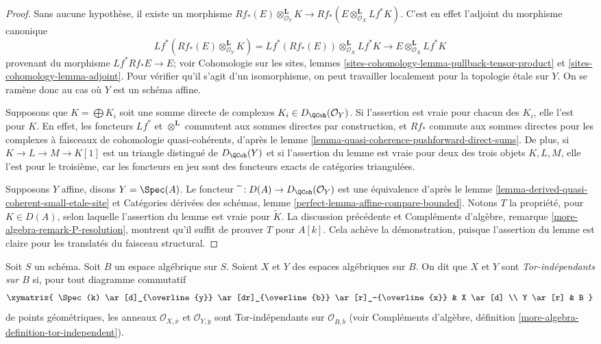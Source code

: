 \begin{proof}
Sans aucune hypoth\`ese, il existe un morphisme
$Rf_*(E)\otimes_{\mathcal{O}_Y}^\mathbf{L}K\to
Rf_*(E\otimes_{\mathcal{O}_X}^\mathbf{L}Lf^*K)$. C'est en effet l'adjoint du
morphisme canonique
$$
Lf^*(Rf_*(E) \otimes_{\mathcal{O}_Y}^\mathbf{L} K) =
Lf^*(Rf_*(E)) \otimes_{\mathcal{O}_X}^\mathbf{L} Lf^*K
\longrightarrow
E \otimes_{\mathcal{O}_X}^\mathbf{L} Lf^*K
$$
provenant du morphisme $Lf^*Rf_*E\to E$; voir Cohomologie sur les sites,
lemmes \ref{sites-cohomology-lemma-pullback-tensor-product} et
\ref{sites-cohomology-lemma-adjoint}. Pour v\'erifier qu'il s'agit d'un
isomorphisme, on peut travailler localement pour la topologie \'etale sur $Y$.
On se ram\`ene donc au cas o\`u $Y$ est un sch\'ema affine.

\medskip\noindent
Supposons que $K=\bigoplus K_i$ soit une somme directe de complexes
$K_i\in D_\QCoh(\mathcal{O}_Y)$. Si l'assertion est vraie pour chacun des
$K_i$, elle l'est pour $K$. En effet, les foncteurs $Lf^*$ et
$\otimes^\mathbf{L}$ commutent aux sommes directes par construction, et $Rf_*$
commute aux sommes directes pour les complexes \`a faisceaux de cohomologie
quasi-coh\'erents, d'apr\`es le lemme
\ref{lemma-quasi-coherence-pushforward-direct-sums}. De plus, si
$K\to L\to M\to K[1]$ est un triangle distingu\'e de $D_\QCoh(Y)$ et si
l'assertion du lemme est vraie pour deux des trois objets $K,L,M$, elle l'est
pour le troisi\`eme, car les foncteurs en jeu sont des foncteurs exacts de
cat\'egories triangul\'ees.

\medskip\noindent
Supposons $Y$ affine, disons $Y=\Spec(A)$. Le foncteur
$\widetilde{\ }:D(A)\to D_\QCoh(\mathcal{O}_Y)$ est une \'equivalence d'apr\`es
le lemme \ref{lemma-derived-quasi-coherent-small-etale-site} et Cat\'egories
d\'eriv\'ees des sch\'emas, lemme
\ref{perfect-lemma-affine-compare-bounded}. Notons $T$ la propri\'et\'e, pour
$K\in D(A)$, selon laquelle l'assertion du lemme est vraie pour
$\widetilde K$. La discussion pr\'ec\'edente et Compl\'ements d'alg\`ebre,
remarque \ref{more-algebra-remark-P-resolution}, montrent qu'il suffit de
prouver $T$ pour $A[k]$. Cela ach\`eve la d\'emonstration, puisque l'assertion
du lemme est claire pour les translat\'es du faisceau structural.
\end{proof}

\begin{definition}
\label{definition-tor-independent}
Soit $S$ un sch\'ema. Soit $B$ un espace alg\'ebrique sur $S$. Soient $X$ et
$Y$ des espaces alg\'ebriques sur $B$. On dit que $X$ et $Y$ sont
{\it Tor-ind\'ependants sur $B$} si, pour tout diagramme commutatif
$$
\xymatrix{
\Spec(k) \ar[d]_{\overline{y}} \ar[dr]_{\overline{b}} \ar[r]_-{\overline{x}} &
X \ar[d] \\
Y \ar[r] & B
}
$$
de points g\'eom\'etriques, les anneaux
$\mathcal{O}_{X,\overline{x}}$ et $\mathcal{O}_{Y,\overline{y}}$ sont
Tor-ind\'ependants sur $\mathcal{O}_{B,\overline{b}}$ (voir Compl\'ements
d'alg\`ebre, d\'efinition \ref{more-algebra-definition-tor-independent}).
\end{definition}


